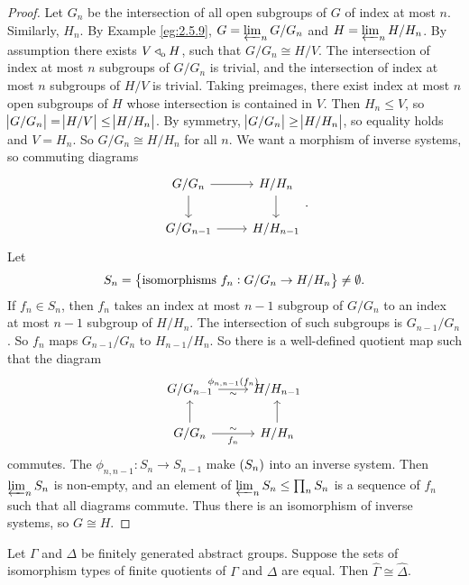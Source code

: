 \begin{proof}
Let $ G_n $ be the intersection of all open subgroups of $ G $ of index at most $ n $. Similarly, $ H_n $. By Example \ref{eg:2.5.9}, $ G = \varprojlim_n G / G_n $ and $ H = \varprojlim_n H / H_n $. By assumption there exists $ V \triangleleft_{\mathrm{o}} H $, such that $ G / G_n \cong H / V $. The intersection of index at most $ n $ subgroups of $ G / G_n $ is trivial, and the intersection of index at most $ n $ subgroups of $ H / V $ is trivial. Taking preimages, there exist index at most $ n $ open subgroups of $ H $ whose intersection is contained in $ V $. Then $ H_n \le V $, so $ \abs{G / G_n} = \abs{H / V} \le \abs{H / H_n} $. By symmetry, $ \abs{G / G_n} \ge \abs{H / H_n} $, so equality holds and $ V = H_n $. So $ G / G_n \cong H / H_n $ for all $ n $. We want a morphism of inverse systems, so commuting diagrams
$$
\begin{tikzcd}
G / G_n \arrow{r} \arrow{d} & H / H_n \arrow{d} \\
G / G_{n - 1} \arrow{r} & H / H_{n - 1}
\end{tikzcd}.
$$
Let
$$ S_n = \cbr{\text{isomorphisms} \ f_n : G / G_n \to H / H_n} \ne \emptyset. $$
If $ f_n \in S_n $, then $ f_n $ takes an index at most $ n - 1 $ subgroup of $ G / G_n $ to an index at most $ n - 1 $ subgroup of $ H / H_n $. The intersection of such subgroups is $ G_{n - 1} / G_n $. So $ f_n $ maps $ G_{n - 1} / G_n $ to $ H_{n - 1} / H_n $. So there is a well-defined quotient map such that the diagram
$$
\begin{tikzcd}
G / G_{n - 1} \arrow{r}{\phi_{n, n - 1}\br{f_n}}[swap]{\sim} & H / H_{n - 1} \\
G / G_n \arrow{r}{\sim}[swap]{f_n} \arrow{u} & H / H_n \arrow{u}
\end{tikzcd}
$$
commutes. The $ \phi_{n, n - 1} : S_n \to S_{n - 1} $ make $ \br{S_n} $ into an inverse system. Then $ \varprojlim_n S_n $ is non-empty, and an element of $ \varprojlim_n S_n \le \prod_n S_n $ is a sequence of $ f_n $ such that all diagrams commute. Thus there is an isomorphism of inverse systems, so $ G \cong H $.
\end{proof}

\begin{theorem}
Let $ \Gamma $ and $ \Delta $ be finitely generated abstract groups. Suppose the sets of isomorphism types of finite quotients of $ \Gamma $ and $ \Delta $ are equal. Then $ \widehat{\Gamma} \cong \widehat{\Delta} $.
\end{theorem}

